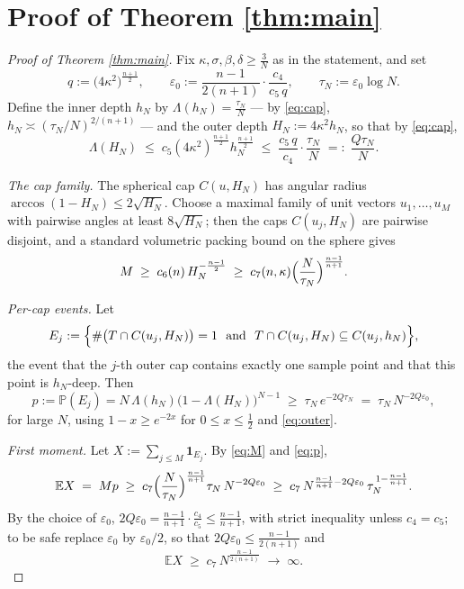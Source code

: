 \documentclass[11pt]{article}
\newcommand{\E}{\mathbb{E}}
\newcommand{\PP}{\mathbb{P}}
\begin{document}
\section{Proof of Theorem \ref{thm:main}}\label{sec:proof}

\begin{proof}[Proof of Theorem \ref{thm:main}]
Fix $\kappa,\sigma,\beta,\delta\ge\frac3N$ as in the statement, and set
\[
q:=\bigl(4\kappa^2\bigr)^{\frac{n+1}2},
\qquad
\varepsilon_0:=\frac{n-1}{2(n+1)}\cdot\frac{c_4}{c_5\,q},
\qquad
\tau_N:=\varepsilon_0\log N .
\]
Define the inner depth $h_N$ by $\Lambda(h_N)=\frac{\tau_N}{N}$ --- by
\eqref{eq:cap}, $h_N\asymp(\tau_N/N)^{2/(n+1)}$ --- and the outer depth
$H_N:=4\kappa^2h_N$, so that by \eqref{eq:cap},
\begin{equation}\label{eq:outer}
\Lambda(H_N)\;\le\;c_5(4\kappa^2)^{\frac{n+1}2}h_N^{\frac{n+1}2}
\;\le\;\frac{c_5\,q}{c_4}\cdot\frac{\tau_N}{N}
\;=:\;\frac{Q\tau_N}{N}.
\end{equation}

\emph{The cap family.}  The spherical cap $C(u,H_N)$ has angular radius
$\arccos(1-H_N)\le2\sqrt{H_N}$.  Choose a maximal family of unit vectors
$u_1,\dots,u_M$ with pairwise angles at least $8\sqrt{H_N}$; then the caps
$C(u_j,H_N)$ are pairwise disjoint, and a standard volumetric packing bound on
the sphere gives
\begin{equation}\label{eq:M}
M\;\ge\;c_6(n)\,H_N^{-\frac{n-1}2}
\;\ge\;c_7(n,\kappa)\Bigl(\frac{N}{\tau_N}\Bigr)^{\frac{n-1}{n+1}} .
\end{equation}

\emph{Per-cap events.}  Let
\[
E_j:=\Bigl\{\#\bigl(T\cap C(u_j,H_N)\bigr)=1\ \text{ and }\
T\cap C(u_j,H_N)\subseteq C(u_j,h_N)\Bigr\},
\]
the event that the $j$-th outer cap contains exactly one sample point and that
this point is $h_N$-deep.  Then
\begin{equation}\label{eq:p}
p:=\PP(E_j)=N\,\Lambda(h_N)\bigl(1-\Lambda(H_N)\bigr)^{N-1}
\;\ge\;\tau_N\,e^{-2Q\tau_N}
\;=\;\tau_N\,N^{-2Q\varepsilon_0},
\end{equation}
for large $N$, using $1-x\ge e^{-2x}$ for $0\le x\le\frac12$ and
\eqref{eq:outer}.

\emph{First moment.}  Let $X:=\sum_{j\le M}\mathbf 1_{E_j}$.  By
\eqref{eq:M} and \eqref{eq:p},
\[
\E X\;=\;Mp\;\ge\;c_7\Bigl(\frac{N}{\tau_N}\Bigr)^{\frac{n-1}{n+1}}
\tau_N\,N^{-2Q\varepsilon_0}
\;\ge\;c_7\,N^{\frac{n-1}{n+1}-2Q\varepsilon_0}\,
\tau_N^{\,1-\frac{n-1}{n+1}} .
\]
By the choice of $\varepsilon_0$,
$2Q\varepsilon_0=\frac{n-1}{n+1}\cdot\frac{c_4}{c_5}\le\frac{n-1}{n+1}$, with
strict inequality unless $c_4=c_5$; to be safe replace $\varepsilon_0$ by
$\varepsilon_0/2$, so that
$2Q\varepsilon_0\le\frac{n-1}{2(n+1)}$ and
\begin{equation}\label{eq:EX}
\E X\;\ge\;c_7\,N^{\frac{n-1}{2(n+1)}}\;\longrightarrow\;\infty .
\end{equation}


\end{proof}
\end{document}

